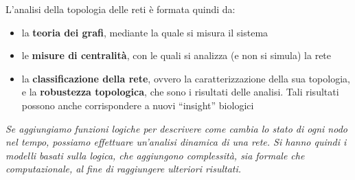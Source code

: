 \documentclass[a4paper,12pt, oneside]{book}
\begin{document}
L'analisi della topologia delle reti è formata quindi da:
\begin{itemize}
  \item la \textbf{teoria dei grafi}, mediante la quale si misura il sistema
  \item le \textbf{misure di centralità}, con le quali si analizza (e non si
  simula) la rete 
  \item la \textbf{classificazione della rete}, ovvero la caratterizzazione
  della sua topologia, e la \textbf{robustezza topologica}, che sono i risultati
  delle analisi. Tali risultati possono anche corrispondere a nuovi ``insight''
  biologici 
\end{itemize}
\textit{Se aggiungiamo funzioni logiche per descrivere come cambia lo stato di
  ogni nodo nel tempo, possiamo effettuare un'analisi dinamica di una rete. Si
  hanno quindi i \emph{modelli basati sulla logica}, che aggiungono complessità,
  sia formale che computazionale, al fine di raggiungere ulteriori risultati.}
\end{document}
